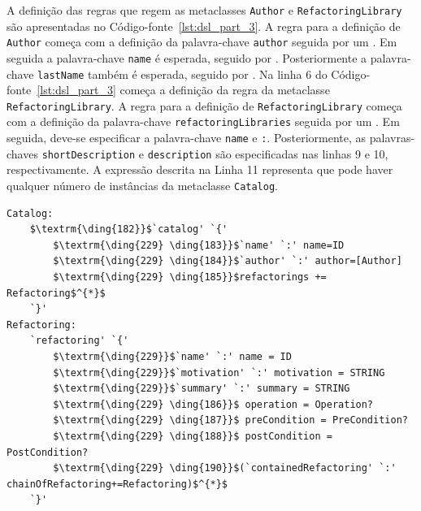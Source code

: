 A definição das regras que regem as metaclasses \texttt{Author} e \texttt{RefactoringLibrary} são apresentadas no Código-fonte~\ref{lst:dsl_part_3}. A regra para a definição de \texttt{Author} começa com a definição da palavra-chave \texttt{author} seguida por um \aspas{\{}. Em seguida a palavra-chave \texttt{name} é esperada, seguido por \aspas{\texttt{:}} . Posteriormente a palavra-chave \texttt{lastName} também é esperada, seguido por \aspas{\texttt{:}} . Na linha 6 do Código-fonte~\ref{lst:dsl_part_3} começa a definição da regra da metaclasse \texttt{RefactoringLibrary}. A regra para a definição de \texttt{RefactoringLibrary} começa com a definição da palavra-chave \texttt{refactoringLibraries} seguida por um \aspas{\{}. Em seguida, deve-se especificar a palavra-chave \texttt{name} e \texttt{:}. Posteriormente, as palavras-chaves \texttt{shortDescription} e \texttt{description} são especificadas nas linhas 9 e 10, respectivamente. A expressão descrita na Linha 11 representa que pode haver qualquer número de instâncias da metaclasse \texttt{Catalog}.

\begin{lstlisting}[language=Xtext, frame=single, basicstyle=\scriptsize, mathescape=true, label={lst:dsl_part_4}, caption={Gramática da DSL - parte 4}]
Catalog:
	$\textrm{\ding{182}}$`catalog' `{' 
		$\textrm{\ding{229} \ding{183}}$`name' `:' name=ID
		$\textrm{\ding{229} \ding{184}}$`author' `:' author=[Author]
		$\textrm{\ding{229} \ding{185}}$refactorings += Refactoring$^{*}$
	`}'
Refactoring:
	`refactoring' `{' 
		$\textrm{\ding{229}}$`name' `:' name = ID
		$\textrm{\ding{229}}$`motivation' `:' motivation = STRING
		$\textrm{\ding{229}}$`summary' `:' summary = STRING
		$\textrm{\ding{229} \ding{186}}$ operation = Operation?
		$\textrm{\ding{229} \ding{187}}$ preCondition = PreCondition?
		$\textrm{\ding{229} \ding{188}}$ postCondition = PostCondition?
		$\textrm{\ding{229} \ding{190}}$(`containedRefactoring' `:' chainOfRefactoring+=Refactoring)$^{*}$
	`}'
\end{lstlisting}

